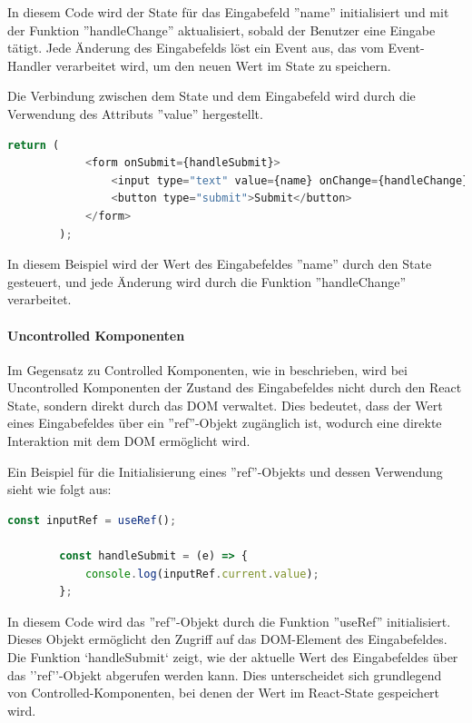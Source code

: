         In diesem Code wird der State für das Eingabefeld ''name'' initialisiert und mit der Funktion ''handleChange'' aktualisiert, sobald der Benutzer eine Eingabe tätigt. Jede Änderung des Eingabefelds löst ein Event aus, das vom Event-Handler verarbeitet wird, um den neuen Wert im State zu speichern.
        
        Die Verbindung zwischen dem State und dem Eingabefeld wird durch die Verwendung des Attributs ''value'' hergestellt.
        
        \begin{lstlisting}[language=JavaScript]
        return (
            <form onSubmit={handleSubmit}> 
                <input type="text" value={name} onChange={handleChange} />  
                <button type="submit">Submit</button> 
            </form>
        );
        \end{lstlisting}

        In diesem Beispiel wird der Wert des Eingabefeldes ''name'' durch den State gesteuert, und jede Änderung wird durch die Funktion ''handleChange'' verarbeitet.
        
        \paragraph{Uncontrolled Komponenten\label{sec:uncontrolledComponents}}
        Im Gegensatz zu Controlled Komponenten, wie in \cite{react_uncontrolled_components} beschrieben, wird bei Uncontrolled Komponenten der Zustand des Eingabefeldes nicht durch den React State, sondern direkt durch das DOM verwaltet. Dies bedeutet, dass der Wert eines Eingabefeldes über ein ''ref''-Objekt zugänglich ist, wodurch eine direkte Interaktion mit dem DOM ermöglicht wird.
        
        Ein Beispiel für die Initialisierung eines ''ref''-Objekts und dessen Verwendung sieht wie folgt aus:
        
        \begin{lstlisting}[language=JavaScript]
        const inputRef = useRef(); 
        
        const handleSubmit = (e) => {
            console.log(inputRef.current.value);  
        };
        \end{lstlisting}
        
        In diesem Code wird das ''ref''-Objekt durch die Funktion ''useRef'' initialisiert. Dieses Objekt ermöglicht den Zugriff auf das DOM-Element des Eingabefeldes. Die Funktion `handleSubmit` zeigt, wie der aktuelle Wert des Eingabefeldes über das ''ref''-Objekt abgerufen werden kann. Dies unterscheidet sich grundlegend von Controlled-Komponenten, bei denen der Wert im React-State gespeichert wird.
        
